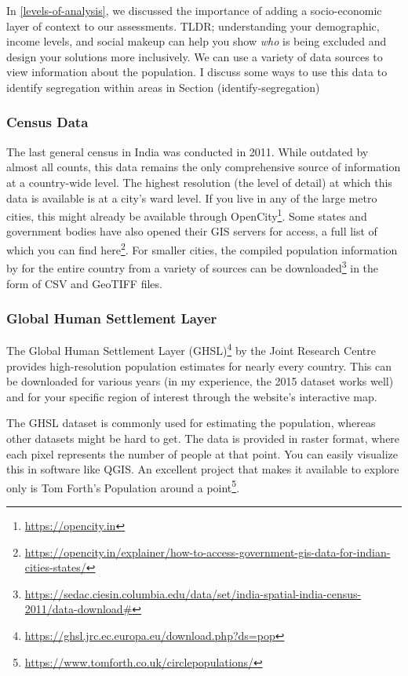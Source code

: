 \documentclass[
]{latex/krantz}
\renewcommand{\href}[2]{#2\footnote{\url{#1}}}
\DeclareRobustCommand{\href}[2]{#2\footnote{\url{#1}}}
\begin{document}
In \ref{levels-of-analysis}, we discussed the importance of adding a socio-economic layer of context to our assessments. TLDR; understanding your demographic, income levels, and social makeup can help you show \emph{who} is being excluded and design your solutions more inclusively. We can use a variety of data sources to view information about the population. I discuss some ways to use this data to identify segregation within areas in Section \textcite{ref}(identify-segregation)

\hypertarget{census-data}{%
\subsubsection*{Census Data}\label{census-data}}


The last general census in India was conducted in 2011. While outdated by almost all counts, this data remains the only comprehensive source of information at a country-wide level. The highest resolution (the level of detail) at which this data is available is at a city's ward level. If you live in any of the large metro cities, this might already be available through \href{https://opencity.in}{OpenCity}. Some states and government bodies have also opened their GIS servers for access, a full list of which you can find \href{https://opencity.in/explainer/how-to-access-government-gis-data-for-indian-cities-states/}{here}. For smaller cities, the compiled population information by \autocite{balkSpatialData20112020} for the entire country from a variety of sources can be \href{https://sedac.ciesin.columbia.edu/data/set/india-spatial-india-census-2011/data-download\#}{downloaded} in the form of CSV and GeoTIFF files.

\hypertarget{global-human-settlement-layer}{%
\subsubsection*{Global Human Settlement Layer}\label{global-human-settlement-layer}}


The \href{https://ghsl.jrc.ec.europa.eu/download.php?ds=pop}{Global Human Settlement Layer (GHSL)} by the Joint Research Centre provides high-resolution population estimates for nearly every country. This can be downloaded for various years (in my experience, the 2015 dataset works well) and for your specific region of interest through the website's interactive map.

The GHSL dataset is commonly used for estimating the population, whereas other datasets might be hard to get. The data is provided in raster format, where each pixel represents the number of people at that point. You can easily visualize this in software like QGIS. An excellent project that makes it available to explore only is Tom Forth's \href{https://www.tomforth.co.uk/circlepopulations/}{Population around a point}.
\end{document}
